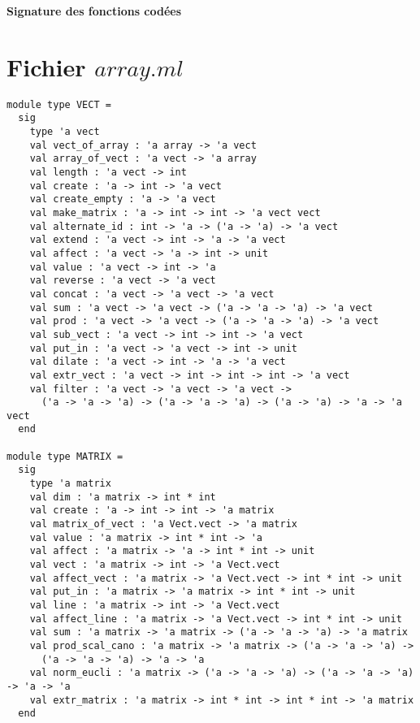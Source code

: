 \documentclass[a4paper,10pt]{article}
\title{}
\author{}
\begin{document}
  
  \begin{center}
    \LARGE \textbf{Signature des fonctions cod\'{e}es}
  \end{center}

  \section*{Fichier $array.ml$}
  
    \begin{verbatim}
module type VECT =
  sig
    type 'a vect
    val vect_of_array : 'a array -> 'a vect
    val array_of_vect : 'a vect -> 'a array
    val length : 'a vect -> int
    val create : 'a -> int -> 'a vect
    val create_empty : 'a -> 'a vect
    val make_matrix : 'a -> int -> int -> 'a vect vect
    val alternate_id : int -> 'a -> ('a -> 'a) -> 'a vect
    val extend : 'a vect -> int -> 'a -> 'a vect
    val affect : 'a vect -> 'a -> int -> unit
    val value : 'a vect -> int -> 'a
    val reverse : 'a vect -> 'a vect
    val concat : 'a vect -> 'a vect -> 'a vect
    val sum : 'a vect -> 'a vect -> ('a -> 'a -> 'a) -> 'a vect
    val prod : 'a vect -> 'a vect -> ('a -> 'a -> 'a) -> 'a vect
    val sub_vect : 'a vect -> int -> int -> 'a vect
    val put_in : 'a vect -> 'a vect -> int -> unit
    val dilate : 'a vect -> int -> 'a -> 'a vect
    val extr_vect : 'a vect -> int -> int -> int -> 'a vect
    val filter : 'a vect -> 'a vect -> 'a vect -> 
      ('a -> 'a -> 'a) -> ('a -> 'a -> 'a) -> ('a -> 'a) -> 'a -> 'a vect
  end
  
module type MATRIX =
  sig
    type 'a matrix
    val dim : 'a matrix -> int * int
    val create : 'a -> int -> int -> 'a matrix
    val matrix_of_vect : 'a Vect.vect -> 'a matrix
    val value : 'a matrix -> int * int -> 'a
    val affect : 'a matrix -> 'a -> int * int -> unit
    val vect : 'a matrix -> int -> 'a Vect.vect
    val affect_vect : 'a matrix -> 'a Vect.vect -> int * int -> unit
    val put_in : 'a matrix -> 'a matrix -> int * int -> unit
    val line : 'a matrix -> int -> 'a Vect.vect
    val affect_line : 'a matrix -> 'a Vect.vect -> int * int -> unit
    val sum : 'a matrix -> 'a matrix -> ('a -> 'a -> 'a) -> 'a matrix
    val prod_scal_cano : 'a matrix -> 'a matrix -> ('a -> 'a -> 'a) -> 
      ('a -> 'a -> 'a) -> 'a -> 'a
    val norm_eucli : 'a matrix -> ('a -> 'a -> 'a) -> ('a -> 'a -> 'a) -> 'a -> 'a
    val extr_matrix : 'a matrix -> int * int -> int * int -> 'a matrix
  end
    \end{verbatim}
 
\end{document}
